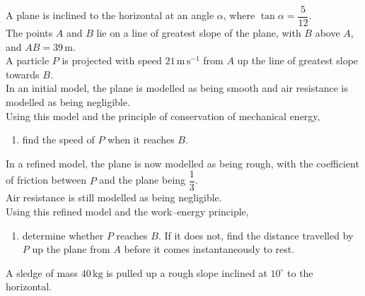 \documentclass[leqno]{article}
\begin{document}
\begin{enumerate}[
  label=\textbf{\arabic*.},
  leftmargin=*,
  topsep=0pt,
  partopsep=0pt,
  parsep=0pt
]
\newpage

\questionitem

A plane is inclined to the horizontal at an angle $\alpha$, where $\tan\alpha=\dfrac{5}{12}$. \\

The points $A$ and $B$ lie on a line of greatest slope of the plane, with $B$ above $A$, and $AB=39\,\mathrm{m}$. \\

A particle $P$ is projected with speed $21\,\mathrm{m\,s^{-1}}$ from $A$ up the line of greatest slope towards $B$. \\

In an initial model, the plane is modelled as being smooth and air resistance is modelled as being negligible. \\

Using this model and the principle of conservation of mechanical energy, \\

\begin{enumerate}[label=\textbf{(\alph*)}]
  \item find the speed of $P$ when it reaches $B$.  \\
\end{enumerate}

In a refined model, the plane is now modelled as being rough, with the coefficient of friction between $P$ and the plane being $\dfrac{1}{3}$. \\

Air resistance is still modelled as being negligible. \\

Using this refined model and the work--energy principle, \\

\begin{enumerate}[label=\textbf{(\alph*)}, resume]
  \item determine whether $P$ reaches $B$. If it does not, find the distance travelled by $P$ up the plane from $A$ before it comes instantaneously to rest.  \\
\end{enumerate}

\newpage

\questionitem

A sledge of mass $40\,\mathrm{kg}$ is pulled up a rough slope inclined at $10^\circ$ to the horizontal. \\


\end{enumerate}
\end{document}
